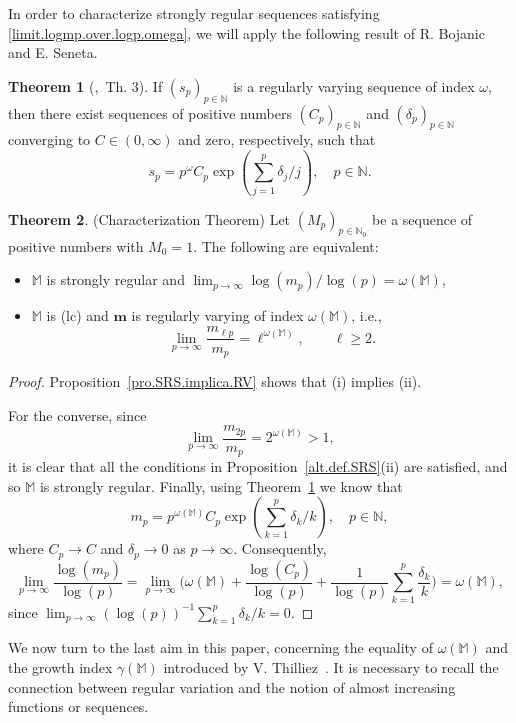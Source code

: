 \documentclass[11pt,a4paper]{article}
\theoremstyle{definition}
\newtheorem{theo}{Theorem}[section]
\def\oo{\infty}
\def\ri{\rightarrow}
\def\o{\omega}
\def\ga{\gamma}
\def\N{\mathbb{N}}
\def\M{\mathbb{M}}
\def\bm{\boldsymbol{m}}
\begin{document}
In order to characterize strongly regular sequences satisfying \eqref{limit.logmp.over.logp.omega}, we will apply the following result of R. Bojanic and E. Seneta.

\begin{theo}[\cite{BojanicSeneta},\ Th. 3]\label{theoBojanicSeneta}
If $(s_p)_{p\in\N}$ is a regularly varying sequence of index $\o$, then there exist sequences of positive numbers
$(C_p)_{p\in\N}$ and $(\delta_p)_{p\in\N}$ converging to $C\in(0,\oo)$ and zero,
respectively, such that
$$s_p=p^{\o} C_p \exp  \left(\sum^{p}_{j=1}\delta_j/j\right),\quad p\in\N. $$
\end{theo}


\begin{theo} \label{teocaractsucfrbyregvar}(Characterization Theorem)
Let  $(M_p)_{p\in\N_0}$ be a sequence of positive numbers with $M_0=1$. The following are equivalent:
\begin{itemize}
\item[(i)] $\M$ is strongly regular and $\lim_{p\ri\oo} \log(m_p)/\log(p)=\o(\M)$,
\item[(ii)] $\M$ is (lc) and $\bm$ is regularly varying of index $\o(\M)$, i.e.,
 $$\lim_{p\ri\oo} \frac{m_{\ell p}}{m_p}=\ell^{\o(\M)}, \qquad \ell\geq 2.$$
\end{itemize}
\end{theo}

\begin{proof}
Proposition~\ref{pro.SRS.implica.RV} shows that (i) implies (ii).\par
For the converse, since
 $$\lim_{p\ri\oo}\frac{m_{2p}}{m_p}=2^{\o(\M)}>1,$$
it is clear that all the conditions in Proposition~\ref{alt.def.SRS}(ii) are satisfied, and so $\M$ is strongly regular. Finally, using
Theorem~\ref{theoBojanicSeneta} we know that
$$m_p=p^{\o(\M)} C_p \exp  \left(\sum^{p}_{k=1}\delta_k/k\right),\quad p\in\N,$$
where $C_p\ri C$ and $\delta_p\ri0$ as $p\ri\oo$. Consequently,
$$\lim_{p\ri\oo} \frac{\log(m_p)}{\log(p)}= \lim_{p\ri\oo}\Big( \o(\M)
+ \frac{\log (C_p)}{\log(p)}+ \frac{1}{\log(p)} \sum^{p}_{k=1} \frac{\delta_k}{k}\Big) =\o(\M), $$
since $\lim_{p\ri\oo} (\log(p))^{-1} \sum^{p}_{k=1} \delta_k/k =0$.
\end{proof}

We now turn to the last aim in this paper, concerning the equality of $\o(\M)$ and the growth index $\ga(\M)$ introduced by V. Thilliez~\cite{thilliez}. It is necessary to recall the connection between regular variation and the notion of almost increasing functions or sequences.
\end{document}
